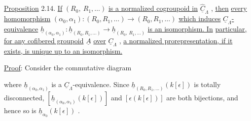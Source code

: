 \underline{Proposition} 2.14.  \underline{If} $(R_0,\ R_1,\ldots)$ \underline{is a normalized cogroupoid in} $\widehat{\underline{C}}_\Lambda$ , \underline{then} \underline{every homomorphism} $(\alpha_0,\alpha_1) : (R_0,R_1,\ldots) \to (R_0,R_1,\ldots)$ \underline{which induces} $\underline{C}_\Lambda$\underline{-equivalence} $\underline{h}_{(\alpha_0,\alpha_1)} : \underline{h}_{(R_0,R_1,\ldots)} \longrightarrow \underline{h}_{(R_0,\ R_1,\ldots)}$ \underline{is an isomorphism. In}
\underline{particular, for any cofibered groupoid} $\underline{A}$ \underline{over} $\underline{C}_\Lambda$ , \underline{a normalized prorepresentation, if it exists, is unique up to an isomorphism.}

\underline{Proof}:  Consider the commutative diagram

\begin{center}
\end{center}
where $\underline{h}_{(\alpha_0,\alpha_1)}$ is a $\underline{C}_\Lambda$-equivalence. Since $\underline{h}_{(R_0,R_1,\ldots)}(k[\epsilon])$ is totally disconnected, $[\underline{h}_{(\alpha_0,\alpha_1)}(k[\epsilon])]$ and $[\epsilon(k[\epsilon])]$ are both bijections, and hence so is $\underline{h}_{\alpha_0}(k[\epsilon])$ .

